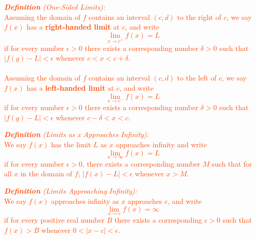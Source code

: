 \documentclass{report}
\newenvironment{definition}[1][OrangeRed]
  {\begin{tcolorbox}[colframe=#1,colback=white]}
  {\end{tcolorbox}}
\begin{document}
\begin{definition}
    \textcolor{OrangeRed}{\textit{\textbf{Definition} (One-Sided Limits):}\\
    Assuming the domain of $f$ contains an interval $(c,d)$ to the right of $c$, we say $f(x)$ has a \textbf{right-handed limit} at $c$, and write 
    \begin{equation}
        \lim_{x \to c^+} f(x) = L
    \end{equation}
    if for every number $\epsilon > 0$ there exists a corresponding number $ \delta > 0$ such that $|f(g) - L| < \epsilon$ whenever $c < x< c + \delta$.\\
    \textcolor{White}{123}\\
    Assuming the domain of $f$ contains an interval $(c,d)$ to the left of $c$, we say $f(x)$ has a \textbf{left-handed limit} at $c$, and write 
    \begin{equation}
        \lim_{x \to c^-} f(x) = L
    \end{equation}
    if for every number $\epsilon > 0$ there exists a corresponding number $ \delta > 0$ such that $|f(g) - L| < \epsilon$ whenever $c - \delta< x < c$.}
\end{definition}

\begin{definition}
    \textcolor{OrangeRed}{\textit{\textbf{Definition} (Limits as x Approaches Infinity):}\\
    We say $f(x)$ has the limit $L$ as $x$ approaches infinity and write
    \begin{equation}
        \lim_{x \to \infty} f(x) = L
    \end{equation}
    if for every number $\epsilon > 0$, there exists a corresponding number $M$ such that for all $x$ in the domain of $f$; $|f(x) - L| < \epsilon$ whenever $x > M$.}
\end{definition}

\begin{definition}
    \textcolor{OrangeRed}{\textit{\textbf{Definition} (Limits Approaching Infinity):}\\
    We say $f(x)$ approaches infinity as $x$ approaches $c$, and write
    \begin{equation}
        \lim_{x \to c} f(x) = \infty
    \end{equation}
   if for every positive real number $B$ there exists a corresponding $\epsilon > 0$ such that $f(x) > B$ whenever $0 < |x - c| < \epsilon$.}
\end{definition}
\end{document}
